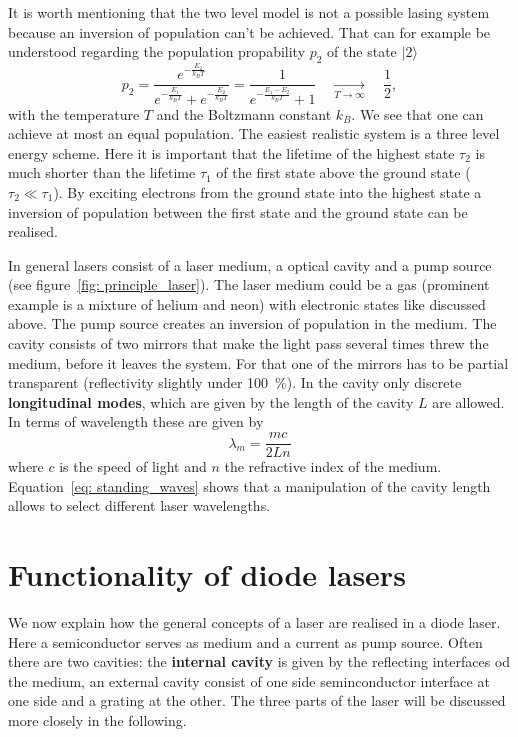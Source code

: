 It is worth mentioning that the two level model is not a possible lasing system because an inversion of population
can't be achieved. That can for example be understood
regarding the population propability $p_2$ of the state $|2\rangle$
\begin{equation}
  p_2 = \frac{e^{-\frac{E_2}{k_B T}}}{ e^{-\frac{E_1}{k_B T}} + e^{-\frac{E_2}{k_B T}} } =
  \frac{1}{ e^{-\frac{E_1 - E_2}{k_B T}} + 1}
    \quad \underset{T \rightarrow \infty}{\longrightarrow}\quad  \frac{1}{2},
\end{equation}
with the temperature $T$ and the Boltzmann constant $k_B$. We see that one can achieve at most an equal population. The easiest
realistic system is a three level energy scheme. Here it is important that the lifetime of the highest state $\tau_2$ is much shorter
than the lifetime $\tau_1$ of the first state above the ground state ($\tau_2 \ll \tau_1$). By exciting electrons from the ground state into the highest
state a inversion of population between the first state and the ground state can be realised.

In general lasers consist of a laser medium, a optical cavity and a pump source (see figure~\ref{fig: principle_laser}).
The laser medium could be a gas (prominent example is a mixture of helium and neon) with electronic states like discussed above. The pump source
creates an inversion of population in the medium. The cavity consists of two mirrors that make the light pass several times threw the medium, before
it leaves the system. For that one of the mirrors has to be partial transparent (reflectivity slightly under \SI{100}{\percent}). In the
cavity only discrete \textbf{longitudinal modes}, which are given by the length of the cavity $L$ are allowed. In terms of wavelength these are
given by
\begin{equation}
  \lambda_m = \frac{m c}{2 L n}
  \label{eq: standing_waves}
\end{equation}
where $c$ is the speed of light and $n$ the refractive index of the medium. Equation~\eqref{eq: standing_waves} shows that a manipulation of the
cavity length allows to select different laser wavelengths.

\section{Functionality of diode lasers}
We now explain how the general concepts of a laser are realised in a diode laser. Here a semiconductor serves as medium and a current as pump source.
Often there are two cavities: the \textbf{internal cavity} is given by the reflecting interfaces od the medium, an external cavity consist of
one side seminconductor interface at one side and a grating at the other. The three parts of the laser will be discussed more closely in the following.

